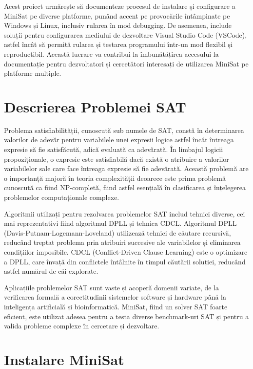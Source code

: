 \documentclass{llncs}
\begin{document}
Acest proiect urmărește să documenteze procesul de instalare și configurare a MiniSat pe diverse platforme, punând accent pe provocările întâmpinate pe Windows și Linux, inclusiv rularea în mod debugging. De asemenea, include soluții pentru configurarea mediului de dezvoltare Visual Studio Code (VSCode), astfel încât să permită rularea și testarea programului într-un mod flexibil și reproductibil. Această lucrare va contribui la îmbunătățirea accesului la documentație pentru dezvoltatori și cercetători interesați de utilizarea MiniSat pe platforme multiple.

\newpage

\section{Descrierea Problemei SAT}

Problema satisfiabilității, cunoscută sub numele de SAT, constă în determinarea valorilor de adevăr pentru variabilele unei expresii logice astfel încât întreaga expresie să fie satisfăcută, adică evaluată ca adevărată. În limbajul logicii propoziționale, o expresie este satisfiabilă dacă există o atribuire a valorilor variabilelor sale care face întreaga expresie să fie adevărată. Această problemă are o importanță majoră în teoria complexității deoarece este prima problemă cunoscută ca fiind NP-completă, fiind astfel esențială în clasificarea și înțelegerea problemelor computaționale complexe.

Algoritmii utilizați pentru rezolvarea problemelor SAT includ tehnici diverse, cei mai reprezentativi fiind algoritmul DPLL și tehnica CDCL. Algoritmul DPLL (Davis-Putnam-Logemann-Loveland) utilizează tehnici de căutare recursivă, reducând treptat problema prin atribuiri succesive ale variabilelor și eliminarea condițiilor imposibile. CDCL (Conflict-Driven Clause Learning) este o optimizare a DPLL, care învață din conflictele întâlnite în timpul căutării soluției, reducând astfel numărul de căi explorate.

Aplicațiile problemelor SAT sunt vaste și acoperă domenii variate, de la verificarea formală a corectitudinii sistemelor software și hardware până la inteligența artificială și bioinformatică. MiniSat, fiind un solver SAT foarte eficient, este utilizat adesea pentru a testa diverse benchmark-uri SAT și pentru a valida probleme complexe în cercetare și dezvoltare.



\section{Instalare MiniSat}
\end{document}
